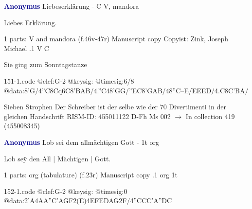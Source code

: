 \documentclass[twocolumn]{book}
\begin{document}
\newline \par \vspace{7pt} \textcolor{darkblue}{\textbf{Anonymus  }}
\newline Liebeserklärung - C
\newline V, mandora
\newline \begin{itshape}[heading, f.46v:] Liebes Erklärung.\end{itshape} 
\newline \textcolor{darkblue}{}  1 parts: V and mandora  (f.46v-47r)
\newline Manuscript copy
\newline Copyist: Zink, Joseph Michael
.1  V  C
\newline \begin{footnotesize} Sie ging zum Sonntagstanze \end{footnotesize}  
\begin{filecontents*}{151-1.code}
@clef:G-2
@keysig:
@timesig:6/8
@data:8'G/4''C8Cq6C{8'BA}B/4.''C48'GG/''EC{8'GA}B/48''C--E/EEED/4.C{8C'B}A/
\end{filecontents*}
\newline
%

\newline Sieben Strophen
\newline Der Schreiber ist der selbe wie der 70 Divertimenti in der gleichen Handschrift
\newline RISM-ID: 455011122
\newline D-Fh  Ms 002
\newline $\rightarrow$ In collection 419 (455008345)
      
\newline \par \vspace{7pt} \textcolor{darkblue}{\textbf{Anonymus  }}
\newline Lob sei dem allmächtigen Gott - 1t
\newline org
\newline \begin{itshape}[f.23r, at left:] Lob seÿ den All | Mächtigen | Gott.\end{itshape} 
\newline \textcolor{darkblue}{}  1 parts: org (tabulature)  (f.23r)
\newline Manuscript copy
.1  org  1t  
\begin{filecontents*}{152-1.code}
@clef:G-2
@keysig:
@timesig:0
@data:2'A4AA''C'AGF2(E)4EFEDAG2F/4''CCC'A''DC
\end{filecontents*}
\newline
%
\end{document}
